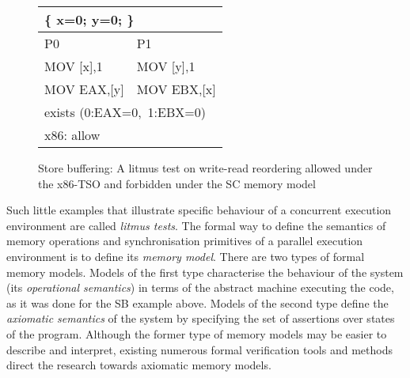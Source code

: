 \begin{figure}[t]
\centering
\ttfamily
\begin{tabular}{ |l|l| }
\hline
\multicolumn{2}{|l|}{ \{ x=0; y=0; \}} \tabularnewline \hline
P0 & P1 \\ \hline
MOV [x],1 & MOV [y],1 \\
MOV EAX,[y] & MOV EBX,[x] \\
\hline
\multicolumn{2}{|l|}{exists (0:EAX=0,~1:EBX=0)} \tabularnewline
\hline
\multicolumn{2}{|l|}{x86: allow} \tabularnewline
\hline
\end{tabular}
\caption{Store buffering: A litmus test on write-read reordering allowed under the x86-TSO and forbidden under the SC memory model}
\label{simple_wmm_x86}
\end{figure}


Such little examples that illustrate specific behaviour of a concurrent execution environment are called \textit{litmus tests}.
The formal way to define the semantics of memory operations and synchronisation primitives of a parallel execution environment is to define its \textit{memory model}.
There are two types of formal memory models. Models of the first type characterise the behaviour of the system (its \textit{operational semantics}) in terms of the abstract machine executing the code, as it was done for the SB example above.
Models of the second type define the \textit{axiomatic semantics} of the system by specifying the set of assertions over states of the program.
Although the former type of memory models may be easier to describe and interpret, existing numerous formal verification tools and methods direct the research towards axiomatic memory models.

